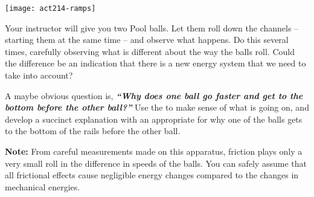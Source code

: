 \begin{center}
	\texttt{[image: act214-ramps]}
\end{center}

\noindent Your instructor will give you two Pool balls. Let them roll down the channels -- starting them at the same time -- and observe what happens. Do this several times, carefully observing what is different about the way the balls roll. Could the difference be an indication that there is a new energy system that we need to take into account?

A maybe obvious question is, \textbf{\emph{``Why does one ball go faster and get to the bottom before the other ball?''}} Use the \EnergyInteractionModel{} to make sense of what is going on, and develop a succinct explanation with an appropriate \EnergyDiagram{} for why one of the balls gets to the bottom of the rails before the other ball.

\textbf{Note:} From careful measurements made on this apparatus, friction plays only a very small roll in the difference in speeds of the balls. You can safely assume that all frictional effects cause negligible energy changes compared to the changes in mechanical energies. 

\WCD